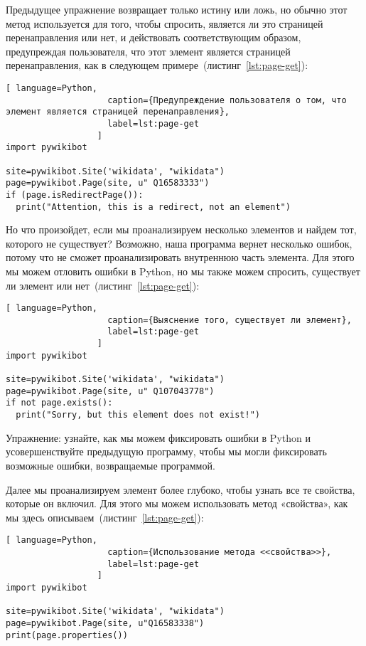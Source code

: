 Предыдущее упражнение возвращает только истину или ложь, но обычно этот метод используется для того, чтобы спросить, является ли это страницей перенаправления или нет, и действовать соответствующим образом, предупреждая пользователя, что этот элемент является страницей перенаправления, как в следующем примере~(листинг~\ref{lst:page-get}):

\begin{lstlisting}[ language=Python,
                    caption={Предупреждение пользователя о том, что элемент является страницей перенаправления},
                    label=lst:page-get
                  ]
import pywikibot

site=pywikibot.Site('wikidata', "wikidata")
page=pywikibot.Page(site, u" Q16583333")
if (page.isRedirectPage()):
  print("Attention, this is a redirect, not an element")
\end{lstlisting}

Но что произойдет, если мы проанализируем несколько элементов и найдем тот, которого не существует? Возможно, наша программа вернет несколько ошибок, потому что не сможет проанализировать внутреннюю часть элемента. Для этого мы можем отловить ошибки в Python, но мы также можем спросить, существует ли элемент или нет~(листинг~\ref{lst:page-get}):

\begin{lstlisting}[ language=Python,
                    caption={Выяснение того, существует ли элемент},
                    label=lst:page-get
                  ]
import pywikibot

site=pywikibot.Site('wikidata', "wikidata")
page=pywikibot.Page(site, u" Q107043778")
if not page.exists():
  print("Sorry, but this element does not exist!")
\end{lstlisting}

Упражнение: узнайте, как мы можем фиксировать ошибки в Python и усовершенствуйте предыдущую программу, чтобы мы могли фиксировать возможные ошибки, возвращаемые программой.

Далее мы проанализируем элемент более глубоко, чтобы узнать все те свойства, которые он включил. Для этого мы можем использовать метод «свойства», как мы здесь описываем~(листинг~\ref{lst:page-get}):

\begin{lstlisting}[ language=Python,
                    caption={Использование метода <<свойства>>},
                    label=lst:page-get
                  ]
import pywikibot

site=pywikibot.Site('wikidata', "wikidata")
page=pywikibot.Page(site, u"Q16583338")
print(page.properties())
\end{lstlisting}

